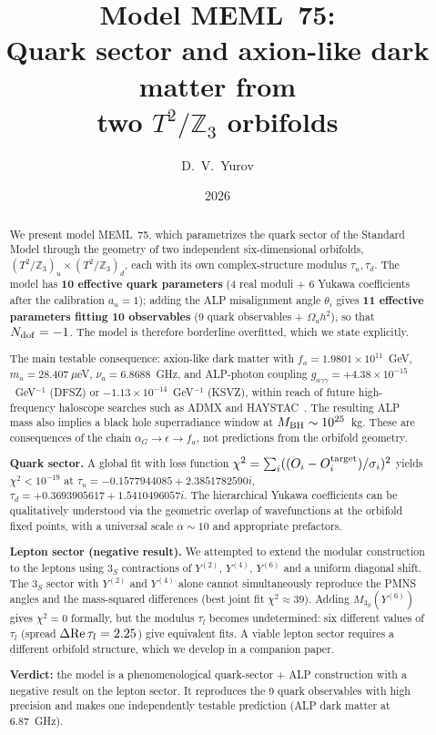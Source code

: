 \documentclass[12pt,a4paper]{article}
\title{\textbf{Model MEML~75:}\\[0.3cm]
\large Quark sector and axion-like dark matter from \\
two \(T^2/\mathbb{Z}_3\) orbifolds}
\author{D.~V.~Yurov}
\date{2026}
\numberwithin{equation}{section}
\begin{document}
\maketitle

\begin{abstract}
\noindent
We present model MEML~75, which parametrizes the quark sector of the Standard Model through the geometry of two independent six-dimensional orbifolds, \((T^2/\mathbb{Z}_3)_u \times (T^2/\mathbb{Z}_3)_d\), each with its own complex-structure modulus \(\tau_u, \tau_d\). The model has \textbf{10 effective quark parameters} (4 real moduli + 6 Yukawa coefficients after the calibration \(a_u = 1\)); adding the ALP misalignment angle \(\theta_i\) gives \textbf{11 effective parameters fitting 10 observables} (9 quark observables + \(\Omega_a h^2\)), so that \(N_{\rm dof} = -1\). The model is therefore borderline overfitted, which we state explicitly.

The main testable consequence: axion-like dark matter with \(f_a = 1.9801\times 10^{11}\)~GeV, \(m_a = 28.407~\mu\)eV, \(\nu_a = 6.8688\)~GHz, and ALP-photon coupling \(g_{a\gamma\gamma} = +4.38\times 10^{-15}\)~GeV\(^{-1}\) (DFSZ) or \(-1.13\times 10^{-14}\)~GeV\(^{-1}\) (KSVZ), within reach of future high-frequency haloscope searches such as ADMX and HAYSTAC~\cite{ADMX2018,HAYSTAC2021}. The resulting ALP mass also implies a black hole superradiance window at \(M_{\rm BH}\sim 10^{25}\)~kg. These are consequences of the chain \(\alpha_G\to \epsilon \to f_a\), not predictions from the orbifold geometry.

\textbf{Quark sector.} A global fit with loss function \(\chi^2 = \sum_i((O_i - O_i^{\rm target})/\sigma_i)^2\) yields \(\chi^2 < 10^{-19}\) at \(\tau_u = -0.1577944085 + 2.3851782590i\), \(\tau_d = +0.3693905617 + 1.5410496057i\). The hierarchical Yukawa coefficients can be qualitatively understood via the geometric overlap of wavefunctions at the orbifold fixed points, with a universal scale \(\alpha \sim 10\) and appropriate prefactors.

\textbf{Lepton sector (negative result).} We attempted to extend the modular construction to the leptons using \(3_S\) contractions of \(Y^{(2)}\), \(Y^{(4)}\), \(Y^{(6)}\) and a uniform diagonal shift. The \(3_S\) sector with \(Y^{(2)}\) and \(Y^{(4)}\) alone cannot simultaneously reproduce the PMNS angles and the mass-squared differences (best joint fit \(\chi^2\approx 39\)). Adding \(M_{3_S}(Y^{(6)})\) gives \(\chi^2 = 0\) formally, but the modulus \(\tau_l\) becomes undetermined: six different values of \(\tau_l\) (spread \(\Delta{\rm Re}\,\tau_l = 2.25\)) give equivalent fits. A viable lepton sector requires a different orbifold structure, which we develop in a companion paper.

\textbf{Verdict:} the model is a phenomenological quark-sector + ALP construction with a negative result on the lepton sector. It reproduces the 9 quark observables with high precision and makes one independently testable prediction (ALP dark matter at 6.87~GHz).
\end{abstract}
\end{document}
